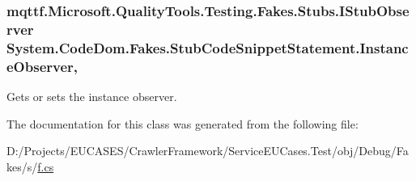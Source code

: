 \hypertarget{class_system_1_1_code_dom_1_1_fakes_1_1_stub_code_snippet_statement_a84678f4611b60f0dbd0ab10fb7a539fd}{
\subsubsection[{Instance\-Observer}]{\setlength{\rightskip}{0pt plus 5cm}mqttf.\-Microsoft.\-Quality\-Tools.\-Testing.\-Fakes.\-Stubs.\-I\-Stub\-Observer System.\-Code\-Dom.\-Fakes.\-Stub\-Code\-Snippet\-Statement.\-Instance\-Observer\hspace{0.3cm}{\ttfamily [get]}, {\ttfamily [set]}}}\label{class_system_1_1_code_dom_1_1_fakes_1_1_stub_code_snippet_statement_a84678f4611b60f0dbd0ab10fb7a539fd}


Gets or sets the instance observer.



The documentation for this class was generated from the following file\-:\begin{DoxyCompactItemize}
\item 
D\-:/\-Projects/\-E\-U\-C\-A\-S\-E\-S/\-Crawler\-Framework/\-Service\-E\-U\-Cases.\-Test/obj/\-Debug/\-Fakes/s/\hyperlink{s_2f_8cs}{f.\-cs}\end{DoxyCompactItemize}
